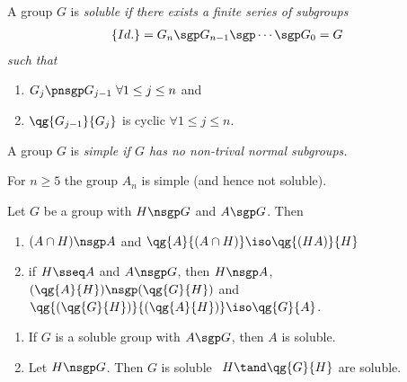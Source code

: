 \documentclass{article}
\begin{document}
\begin{tdefinition}
  A group \( G \) is \it{soluble} if there exists a finite series of subgroups \begin{align*}
    \left\{ Id. \right\} &= G_n \sgp G_{n-1} \sgp \cdots \sgp G_0 = G
  \end{align*}
  such that \begin{enumerate}
    \item \( G_j \pnsgp G_{j-1} \ \forall 1\le j\le n \) and
    \item \( \qg{G_{j-1}}{G_j} \) is cyclic \( \forall 1\le j\le n  \).
  \end{enumerate}
\end{tdefinition}


\begin{tdefinition}
  A group \( G \) is \it{simple} if \( G \) has no non-trival normal subgroups.
\end{tdefinition}

\begin{tlemma}
  For \( n\geq 5 \) the group \( A_n \) is simple (and hence not soluble).
\end{tlemma}


\begin{tlemma}
  Let \( G \) be a group with \( H\nsgp G \) and \( A\sgp G \).
  Then
  \begin{enumerate}
    \item \( (A\cap H)\nsgp A \) and \( \qg{A}{(A\cap H)}\iso \qg{(HA)}{H} \)
    \item if \( H\sseq A \) and \( A\nsgp G \), then \( H\nsgp A \), \( (\qg{A}{H})\nsgp (\qg{G}{H}) \) and \( \qg{(\qg{G}{H})}{(\qg{A}{H})}\iso \qg{G}{A} \).
  \end{enumerate}
\end{tlemma}

\begin{ttheorem}
  \begin{enumerate}
    \item If \( G \) is a soluble group with \( A\sgp G \), then \( A \) is soluble.
    \item Let \( H\nsgp G \). Then \( G \) is soluble \iff~\( H\tand \qg{G}{H} \) are soluble.
  \end{enumerate}
\end{ttheorem}
\end{document}
